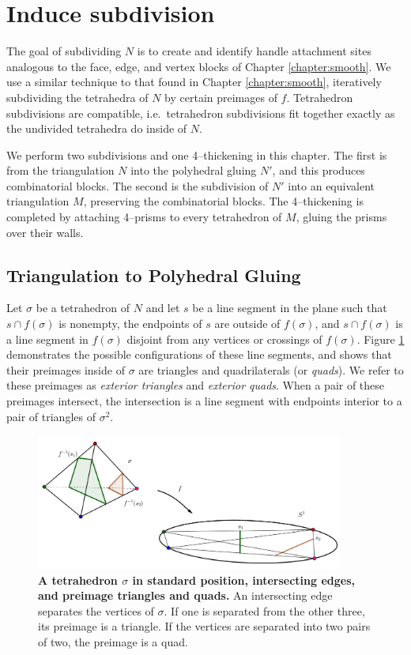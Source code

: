 \section{Induce subdivision}
\label{section:pl-subdivide}

The goal of subdividing $N$ is to create and identify handle attachment sites analogous to the face, edge, and vertex blocks of Chapter \ref{chapter:smooth}.
We use a similar technique to that found in Chapter \ref{chapter:smooth}, iteratively subdividing the tetrahedra of $N$ by certain preimages of $f$.
Tetrahedron subdivisions are compatible, i.e.\ tetrahedron subdivisions fit together exactly as the undivided tetrahedra do inside of $N$.

We perform two subdivisions and one 4--thickening in this chapter.
The first is from the triangulation $N$ into the polyhedral gluing $N'$, and this produces combinatorial blocks.
The second is the subdivision of $N'$ into an equivalent triangulation $M$, preserving the combinatorial blocks.
The 4--thickening is completed by attaching 4--prisms to every tetrahedron of $M$, gluing the prisms over their walls.

\subsection{Triangulation to Polyhedral Gluing}

Let $\sigma$ be a tetrahedron of $N$ and let $s$ be a line segment in the plane such that $s\cap f(\sigma)$ is nonempty, the endpoints of $s$ are outside of $f(\sigma)$,  and $s\cap f(\sigma)$ is a line segment in $f(\sigma)$ disjoint from any vertices or crossings of $f(\sigma)$.
Figure \ref{fig:standard-position-intersection} demonstrates the possible configurations of these line segments, and shows that their preimages inside of $\sigma$ are triangles and quadrilaterals (or \emph{quads}).
We refer to these preimages as \emph{exterior triangles} and \emph{exterior quads}.
When a pair of these preimages intersect, the intersection is a line segment with endpoints interior to a pair of triangles of $\sigma^2$.

\begin{figure}[h!]
	\centering
	\includegraphics[width=0.9\textwidth]{figures/standard-position-intersection.png}
	\caption{
		\textbf{A tetrahedron $\sigma$ in standard position, intersecting edges, and preimage triangles and quads.}
		An intersecting edge separates the vertices of $\sigma$.
		If one is separated from the other three, its preimage is a triangle.
		If the vertices are separated into two pairs of two, the preimage is a quad.
	}
	\label{fig:standard-position-intersection}
\end{figure}

